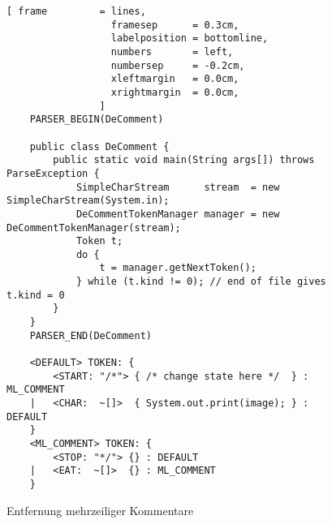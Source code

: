 \begin{figure}[!h]
\centering
\begin{Verbatim}[ frame         = lines, 
                  framesep      = 0.3cm, 
                  labelposition = bottomline,
                  numbers       = left,
                  numbersep     = -0.2cm,
                  xleftmargin   = 0.0cm,
                  xrightmargin  = 0.0cm,
                ]
    PARSER_BEGIN(DeComment)
    
    public class DeComment {
        public static void main(String args[]) throws ParseException {
            SimpleCharStream      stream  = new SimpleCharStream(System.in);
            DeCommentTokenManager manager = new DeCommentTokenManager(stream);
            Token t;
            do {
                t = manager.getNextToken();
            } while (t.kind != 0); // end of file gives t.kind = 0 
        }
    }
    PARSER_END(DeComment)
    
    <DEFAULT> TOKEN: {
        <START: "/*"> { /* change state here */  } : ML_COMMENT
    |   <CHAR:  ~[]>  { System.out.print(image); } : DEFAULT
    }
    <ML_COMMENT> TOKEN: {
        <STOP: "*/"> {} : DEFAULT
    |   <EAT:  ~[]>  {} : ML_COMMENT
    }
\end{Verbatim}
\vspace*{-0.3cm}
\caption{Entfernung mehrzeiliger Kommentare}
\label{fig:DeComment.jj}
\end{figure}

